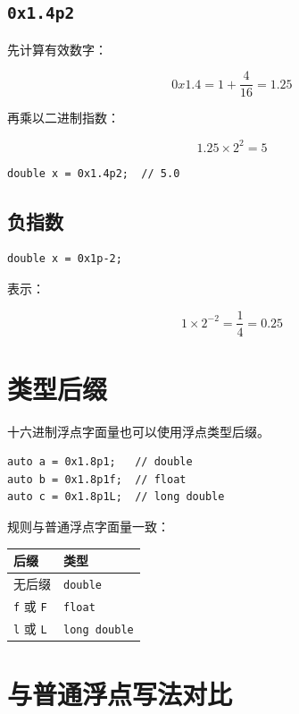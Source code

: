 \documentclass[UTF8,12pt,a4paper]{ctexart}
\begin{document}
\subsection{\texttt{0x1.4p2}}

先计算有效数字：

\[
0x1.4 = 1 + \frac{4}{16} = 1.25
\]

再乘以二进制指数：

\[
1.25 \times 2^2 = 5
\]

\begin{lstlisting}
double x = 0x1.4p2;  // 5.0
\end{lstlisting}

\subsection{负指数}

\begin{lstlisting}
double x = 0x1p-2;
\end{lstlisting}

表示：

\[
1 \times 2^{-2} = \frac{1}{4} = 0.25
\]


\section{类型后缀}

十六进制浮点字面量也可以使用浮点类型后缀。

\begin{lstlisting}
auto a = 0x1.8p1;   // double
auto b = 0x1.8p1f;  // float
auto c = 0x1.8p1L;  // long double
\end{lstlisting}

规则与普通浮点字面量一致：

\begin{center}
\begin{tabular}{ll}
\toprule
后缀 & 类型 \\
\midrule
无后缀 & \texttt{double} \\
\texttt{f} 或 \texttt{F} & \texttt{float} \\
\texttt{l} 或 \texttt{L} & \texttt{long double} \\
\bottomrule
\end{tabular}
\end{center}

\section{与普通浮点写法对比}
\end{document}
